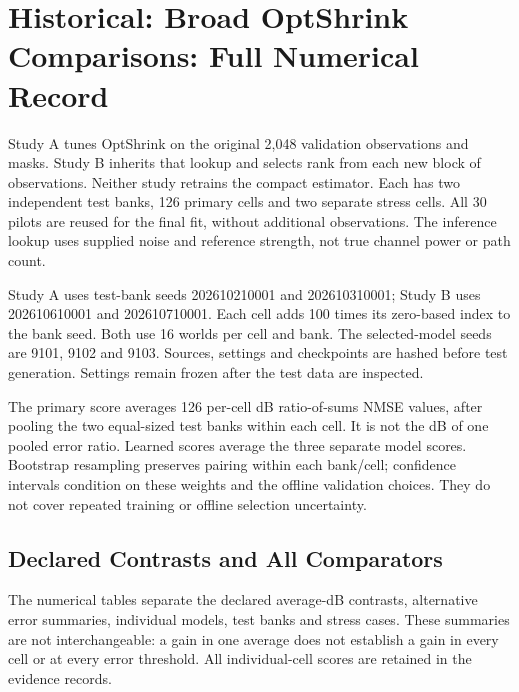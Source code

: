 \section{Historical: Broad OptShrink Comparisons: Full Numerical Record}

Study A tunes OptShrink on the original 2,048 validation observations and masks. Study B inherits that lookup and selects rank from each new block of observations. Neither study retrains the compact estimator. Each has two independent test banks, 126 primary cells and two separate stress cells. All 30 pilots are reused for the final fit, without additional observations. The inference lookup uses supplied noise and reference strength, not true channel power or path count.

Study A uses test-bank seeds 202610210001 and 202610310001; Study B uses 202610610001 and 202610710001. Each cell adds 100 times its zero-based index to the bank seed. Both use 16 worlds per cell and bank. The selected-model seeds are 9101, 9102 and 9103. Sources, settings and checkpoints are hashed before test generation. Settings remain frozen after the test data are inspected.

The primary score averages 126 per-cell dB ratio-of-sums NMSE values, after pooling the two equal-sized test banks within each cell. It is not the dB of one pooled error ratio. Learned scores average the three separate model scores. Bootstrap resampling preserves pairing within each bank/cell; confidence intervals condition on these weights and the offline validation choices. They do not cover repeated training or offline selection uncertainty.

\subsection{Declared Contrasts and All Comparators}

The numerical tables separate the declared average-dB contrasts, alternative error summaries, individual models, test banks and stress cases. These summaries are not interchangeable: a gain in one average does not establish a gain in every cell or at every error threshold. All individual-cell scores are retained in the evidence records.

